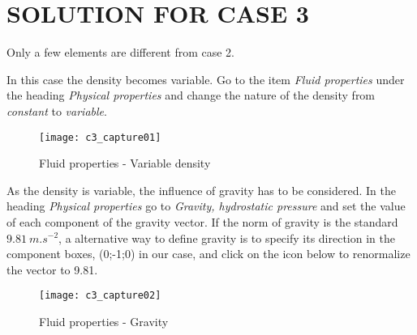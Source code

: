 %
%
%
%
%
%
%
\section{SOLUTION FOR CASE 3}

Only a few elements are different from case 2.

In this case the density becomes variable. Go to the item
{\itshape Fluid properties} under the heading
{\itshape Physical properties} and change the nature of the density from
{\itshape constant} to {\itshape variable}.

\begin{figure}[h!]
\begin{center}
\texttt{[image: c3\_capture01]}
\caption{Fluid properties - Variable density}
\label{fig1_e3}
\end{center}
\end{figure}


\newpage
As the density is variable, the influence of gravity has to be considered. In the
heading {\itshape Physical properties} go to
{\itshape Gravity, hydrostatic pressure} and set the value of each component of
the gravity vector. If the norm of gravity is the standard $9.81\ m.s^{-2}$, a
alternative way to define gravity is to specify its direction in the component
boxes, (0;-1;0) in our case, and click on the icon below to renormalize the
vector to 9.81.

\begin{figure}[h!]
\begin{center}
\texttt{[image: c3\_capture02]}
\caption{Fluid properties - Gravity}
\label{fig2_e3}
\end{center}
\end{figure}


